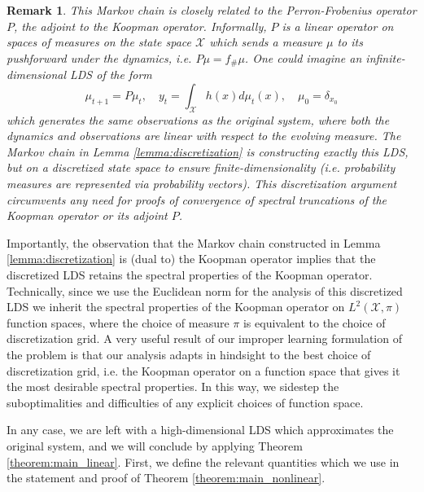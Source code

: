 \documentclass[11pt]{article}
\newtheorem{remark}[theorem]{Remark}
\numberwithin{equation}{section}
\begin{document}
\begin{remark}
\label{remark:perronfrobenius}
    This Markov chain is closely related to the Perron-Frobenius operator $P$, the adjoint to the Koopman operator. Informally, $P$ is a linear operator on spaces of measures on the state space $\mathcal{X}$ which sends a measure $\mu$ to its pushforward under the dynamics, i.e. $P\mu = f_\#\mu$. One could imagine an infinite-dimensional LDS of the form
    $$\mu_{t+1} = P\mu_t,\quad y_{t} = \int_{\mathcal{X}} h(x) d\mu_t(x), \quad \mu_0 = \delta_{x_0}$$
    which generates the same observations as the original system,
    where both the dynamics and observations are linear with respect to the evolving measure. The Markov chain in Lemma \ref{lemma:discretization} is constructing exactly this LDS, but on a discretized state space to ensure finite-dimensionality (i.e. probability measures are represented via probability vectors). This discretization argument circumvents any need for proofs of convergence of spectral truncations of the Koopman operator or its adjoint $P$.
\end{remark}
Importantly, the observation that the Markov chain constructed in Lemma \ref{lemma:discretization} is (dual to) the Koopman operator implies that the discretized LDS retains the spectral properties of the Koopman operator. Technically, since we use the Euclidean norm for the analysis of this discretized LDS we inherit the spectral properties of the Koopman operator on $L^2(\mathcal{X}, \pi)$ function spaces, where the choice of measure $\pi$ is equivalent to the choice of discretization grid. A very useful result of our improper learning formulation of the problem is that our analysis adapts in hindsight to the best choice of discretization grid, i.e. the Koopman operator on a function space that gives it the most desirable spectral properties. In this way, we sidestep the suboptimalities and difficulties of any explicit choices of function space.


In any case, we are left with a high-dimensional LDS which approximates the original system, and we will conclude by applying Theorem \ref{theorem:main_linear}. First, we define the relevant quantities which we use in the statement and proof of Theorem \ref{theorem:main_nonlinear}.
\end{document}
